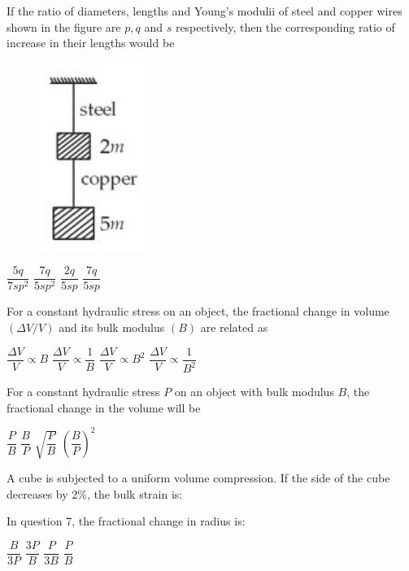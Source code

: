 \documentclass[12pt,a4paper]{exam}
\begin{document}
\begin{questions}
	\question		If the ratio of diameters, lengths and Young's modulii of steel and copper wires shown in the figure are $p,q$ and $s$ respectively, then the corresponding ratio of increase in their lengths would be
	\begin{figure}[!htb]
		\centering
		\includegraphics[scale=0.5]{Y-st-br.png}
	\end{figure}
	\begin{choices}
		\choice		$\dfrac{5q}{7sp^2}$
		\choice		$\dfrac{7q}{5sp^2}$
		\choice		$\dfrac{2q}{5sp}$
		\choice		$\dfrac{7q}{5sp}$
	\end{choices}
	
	\question		For a constant hydraulic stress on an object, the fractional change in volume $ (\Delta V / V) $ and its bulk modulus $ (B) $ are related as 
	\begin{choices}
		\choice		$\dfrac{\Delta V}{V} \propto B$
		\choice		$\dfrac{\Delta V}{V} \propto \dfrac{1}{B}$
		\choice		$\dfrac{\Delta V}{V} \propto B^2$
		\choice		$\dfrac{\Delta V}{V} \propto \dfrac{1}{B^2}$
	\end{choices}
	
	\question		For a constant hydraulic stress $ P $ on an object with bulk modulus $ B $, the fractional change in the volume will be \\
	\begin{choices}
		\choice		$ \dfrac{P}{B} $
		\choice		$ \dfrac{B}{P} $
		\choice		$ \sqrt{\dfrac{P}{B}} $
		\choice		$ \left(\dfrac{B}{P}\right)^2 $
	\end{choices}

\question	A cube is subjected to a uniform volume compression. If the side of the cube decreases by $ 2\% $, the bulk strain is:
\begin{choices}
	\choice		0.02
	\choice		0.03
	\choice		0.04
	\choice		0.06
\end{choices}

\question	In question 7, the fractional change in radius is:
\begin{choices}
	\choice		$ \dfrac{B}{3P} $
	\choice		$ \dfrac{3P}{B} $
	\choice		$ \dfrac{P}{3B} $
	\choice		$ \dfrac{P}{B} $
\end{choices}
	
\end{questions}
\end{document}
